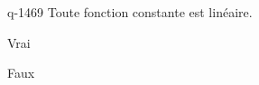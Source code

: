 \begin{truefalse}{q-1469}
Toute fonction constante est linéaire.
\item Vrai
\item* Faux
\end{truefalse}

